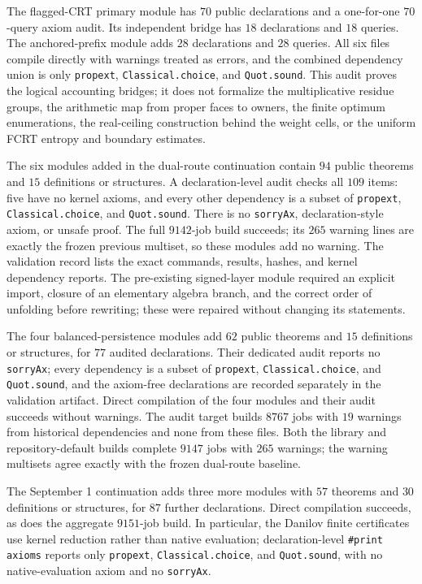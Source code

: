 \documentclass[11pt]{amsart}
\theoremstyle{definition}
\theoremstyle{remark}
\begin{document}
The flagged-CRT primary module has $70$ public declarations and a one-for-one
$70$-query axiom audit.  Its independent bridge has $18$ declarations and
$18$ queries.  The anchored-prefix module adds $28$ declarations and $28$
queries.  All six files compile directly with warnings treated as
errors, and the combined dependency union is only \texttt{propext},
\texttt{Classical.choice}, and \texttt{Quot.sound}.  This audit proves the
logical accounting bridges; it does not formalize the multiplicative residue
groups, the arithmetic map from proper faces to owners, the finite optimum
enumerations, the real-ceiling construction behind the weight cells, or the
uniform FCRT entropy and boundary estimates.

The six modules added in the dual-route continuation contain $94$ public
theorems and $15$ definitions or structures.  A declaration-level audit
checks all $109$ items: five have no kernel axioms, and every other dependency
is a subset of \texttt{propext}, \texttt{Classical.choice}, and
\texttt{Quot.sound}.  There is no \texttt{sorryAx}, declaration-style axiom,
or unsafe proof.  The full $9142$-job build succeeds; its $265$ warning lines
are exactly the frozen previous multiset, so these modules add no warning.
The validation record lists the exact commands, results, hashes, and kernel
dependency reports.
The pre-existing signed-layer module required an explicit import, closure
of an elementary algebra branch, and the correct order of unfolding before
rewriting; these were repaired without changing its statements.

The four balanced-persistence modules add $62$ public theorems and $15$
definitions or structures, for $77$ audited declarations.  Their dedicated
audit reports no \texttt{sorryAx}; every dependency is a subset of
\texttt{propext}, \texttt{Classical.choice}, and \texttt{Quot.sound}, and
the axiom-free declarations are recorded separately in the validation
artifact.  Direct compilation of the four modules and their audit succeeds
without warnings.  The audit target builds $8767$ jobs with $19$ warnings
from historical dependencies and none from these files.  Both the library
and repository-default builds complete $9147$ jobs with $265$ warnings; the
warning multisets agree exactly with the frozen dual-route baseline.

The September 1 continuation adds three more modules with $57$ theorems and
$30$ definitions or structures, for $87$ further declarations.  Direct
compilation succeeds, as does the aggregate $9151$-job build.  In particular,
the Danilov finite certificates use
kernel reduction rather than native evaluation; declaration-level
\texttt{\#print axioms} reports only \texttt{propext},
\texttt{Classical.choice}, and \texttt{Quot.sound}, with no native-evaluation
axiom and no \texttt{sorryAx}.
\end{document}
